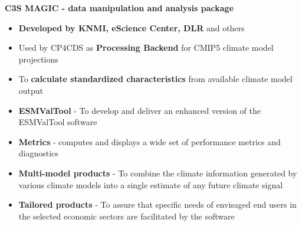 \documentclass[landscape,a0paper,fontscale=0.4]{baposter} %
\newcommand{\compresslist}{%
\setlength{\itemsep}{1pt}%
\setlength{\parskip}{0pt}%
\setlength{\parsep}{0pt}%
}
\begin{document}
\begin{poster}
{    {\bf C3S MAGIC - data manipulation and analysis package}
    \begin{itemize}\compresslist
      \item {\bf Developed by KNMI, eScience Center, DLR} and others
      \item Used by CP4CDS as {\bf Processing Backend} for CMIP5 climate model projections
      \item To {\bf calculate standardized characteristics}
          from available climate model output
      \item {\bf ESMValTool} - To develop and deliver an enhanced version of the ESMValTool software
      \item {\bf Metrics} - computes and displays a wide set of performance metrics and diagnostics
      \item {\bf Multi-model products} - To combine the climate information generated by various climate models
        into a single estimate of any future climate signal
      \item {\bf Tailored products} - To assure that specific needs of envisaged end users in the selected economic
        sectors
        are facilitated by the software
    \end{itemize}

}

\end{poster}
\end{document}
